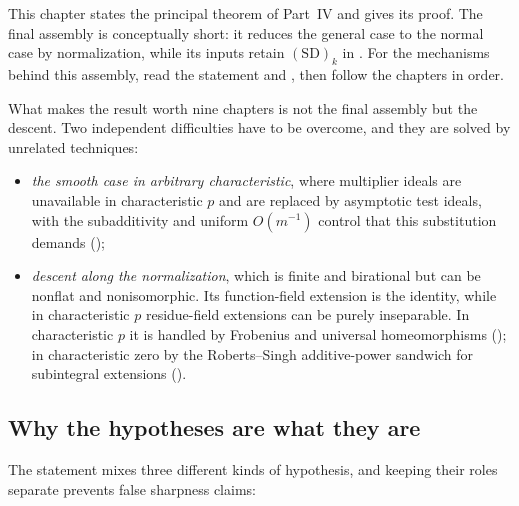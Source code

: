 This chapter states the principal theorem of Part~IV and gives its proof.
The final assembly is conceptually short: it reduces the general case to the
normal case by normalization, while its inputs retain $\mathrm{(SD)}_k$ in
.
For the mechanisms behind this assembly, read the statement and
, then follow the chapters in order.

What makes the result worth nine chapters is not the final assembly but the
descent.  Two independent difficulties have to be overcome, and they are
solved by unrelated techniques:

\begin{itemize}
\item \emph{the smooth case in arbitrary characteristic}, where multiplier
      ideals are unavailable in characteristic $p$ and are replaced by
      asymptotic test ideals, with the subadditivity and uniform
      $O(m^{-1})$ control that this substitution demands
      ();
\item \emph{descent along the normalization}, which is finite and birational
      but can be nonflat and nonisomorphic. Its function-field extension is
      the identity, while in characteristic $p$ residue-field extensions
      can be purely inseparable. In
      characteristic $p$ it is handled by Frobenius and universal
      homeomorphisms (); in
      characteristic zero by the Roberts--Singh additive-power sandwich for
      subintegral extensions ().
\end{itemize}

\subsection{Why the hypotheses are what they are}

The statement mixes three different kinds of hypothesis, and keeping their
roles separate prevents false sharpness claims:

